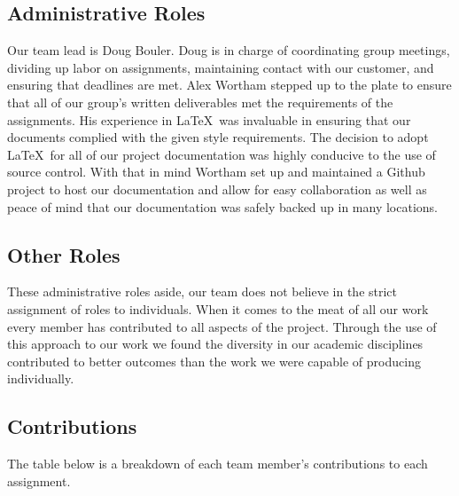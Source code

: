 \documentclass[12pt,letterpaper]{article}
\begin{document}
\subsection{Administrative Roles}
Our team lead is Doug Bouler. Doug is in charge of coordinating group
meetings, dividing up labor on assignments, maintaining contact with our
customer, and ensuring that deadlines are met.  Alex Wortham stepped up to the
plate to ensure that all of our group's written deliverables met the
requirements of the assignments.  His experience in \LaTeX\ was invaluable in
ensuring that our documents complied with the given style requirements.  The
decision to adopt \LaTeX\ for all of our project documentation was highly
conducive to the use of source control.  With that in mind Wortham set up and
maintained a Github project to host our documentation and allow for easy
collaboration as well as peace of mind that our documentation was safely backed
up in many locations.

\subsection{Other Roles}
These administrative roles aside, our team does not
believe in the strict assignment of roles to individuals.  When it comes to the
meat of all our work every member has contributed to all aspects of the project.
Through the use of this approach to our work we found the diversity in our
academic disciplines contributed to better outcomes than the work we were
capable of producing individually. 


\clearpage
\subsection{Contributions}
The table below is a breakdown of each team member's contributions to each assignment.
\end{document}

